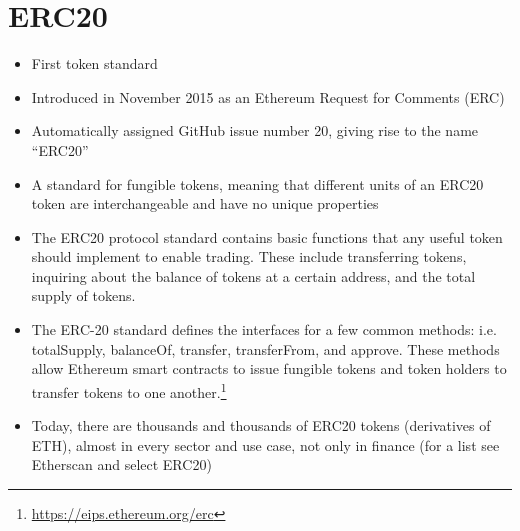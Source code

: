 \section{ERC20}

\begin{itemize}
	\item First token standard
	\item Introduced in November 2015 as an Ethereum Request for Comments (ERC)
	\item Automatically assigned GitHub issue number 20, giving rise to the name ``ERC20''
	\item A standard for fungible tokens, meaning that different units of an ERC20 token are interchangeable and have no unique properties
	\item The ERC20 protocol standard contains basic functions that any useful token should implement to enable trading. These include transferring tokens, inquiring about the balance of tokens at a certain address, and the total supply of tokens.
	\item The ERC-20 standard defines the interfaces for a few common methods: i.e. totalSupply, balanceOf, transfer, transferFrom, and approve. These methods allow Ethereum smart contracts to issue fungible tokens and token holders to transfer tokens to one another.\footnote{\url{https://eips.ethereum.org/erc}}
	\item Today, there are thousands and thousands of ERC20 tokens (derivatives of ETH), almost in every sector and use case, not only in finance (for a list see Etherscan and select ERC20)
\end{itemize}
